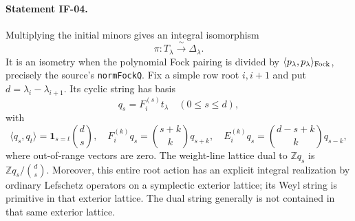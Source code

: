 \paragraph{Statement IF-04.}
Multiplying the initial minors gives an integral isomorphism
\[
 \pi:T_\lambda\xrightarrow{\ \sim\ }\Delta_\lambda.
\]
It is an isometry when the polynomial Fock pairing is divided by
$\langle p_\lambda,p_\lambda\rangle_{\rm Fock}$, precisely the source's
\texttt{normFockQ}. Fix a simple row root $i,i+1$ and put
$d=\lambda_i-\lambda_{i+1}$. Its cyclic string has basis
\[
 q_s=F_i^{(s)}t_\lambda\quad(0\leq s\leq d),
\]
with
\[
 \langle q_s,q_t\rangle=\boldsymbol1_{s=t}\binom ds,
 \quad F_i^{(k)}q_s=\binom{s+k}{k}q_{s+k},
 \quad E_i^{(k)}q_s=\binom{d-s+k}{k}q_{s-k},                 \tag{IF-04a}
\]
where out-of-range vectors are zero. The weight-line lattice dual to
$\mathbb Z q_s$ is $\mathbb Z q_s/\binom ds$. Moreover, this entire
root action has an explicit integral realization by ordinary Lefschetz
operators on a symplectic exterior lattice; its Weyl string is primitive
in that exterior lattice. The dual string generally is not contained in
that same exterior lattice.

